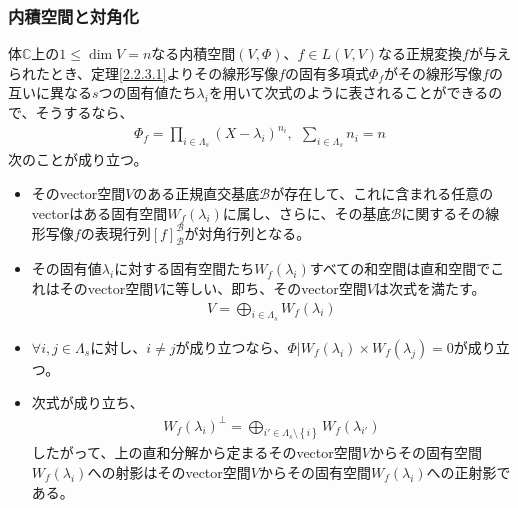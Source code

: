 \documentclass[dvipdfmx]{jsarticle}
\begin{document}
\subsubsection{内積空間と対角化}%
\begin{thm}\label{2.3.9.6}
体$\mathbb{C}$上の$1 \leq \dim V = n$なる内積空間$(V,\varPhi)$、$f \in L(V,V)$なる正規変換$f$が与えられたとき、定理\ref{2.2.3.1}よりその線形写像$f$の固有多項式$\varPhi_{f}$がその線形写像$f$の互いに異なる$s$つの固有値たち$\lambda_{i}$を用いて次式のように表されることができるので、そうするなら、
\begin{align*}
\varPhi_{f} = \prod_{i \in \varLambda_{s}} \left( X - \lambda_{i} \right)^{n_{i}},\ \ \sum_{i \in \varLambda_{s}} n_{i} = n
\end{align*}
次のことが成り立つ。
\begin{itemize}
\item
  そのvector空間$V$のある正規直交基底$\mathcal{B}$が存在して、これに含まれる任意のvectorはある固有空間$W_{f}\left( \lambda_{i} \right)$に属し、さらに、その基底$\mathcal{B}$に関するその線形写像$f$の表現行列$[ f]_{\mathcal{B}}^{\mathcal{B}}$が対角行列となる。
\item
  その固有値$\lambda_{i}$に対する固有空間たち$W_{f}\left( \lambda_{i} \right)$すべての和空間は直和空間でこれはそのvector空間$V$に等しい、即ち、そのvector空間$V$は次式を満たす。
\begin{align*}
V = \bigoplus_{i \in \varLambda_{s}} {W_{f}\left( \lambda_{i} \right)}
\end{align*}
\item
  $\forall i,j \in \varLambda_{s}$に対し、$i \neq j$が成り立つなら、$\varPhi|W_{f}\left( \lambda_{i} \right) \times W_{f}\left( \lambda_{j} \right) = 0$が成り立つ。
\item
  次式が成り立ち、
\begin{align*}
{W_{f}\left( \lambda_{i} \right)}^{\bot} = \bigoplus_{i' \in \varLambda_s \setminus \left\{ i \right\}} {W_{f}\left( \lambda_{i'} \right)}
\end{align*}
したがって、上の直和分解から定まるそのvector空間$V$からその固有空間$W_{f}\left( \lambda_{i} \right)$への射影はそのvector空間$V$からその固有空間$W_{f}\left( \lambda_{i} \right)$への正射影である。
\end{itemize}
\end{thm}
\end{document}
